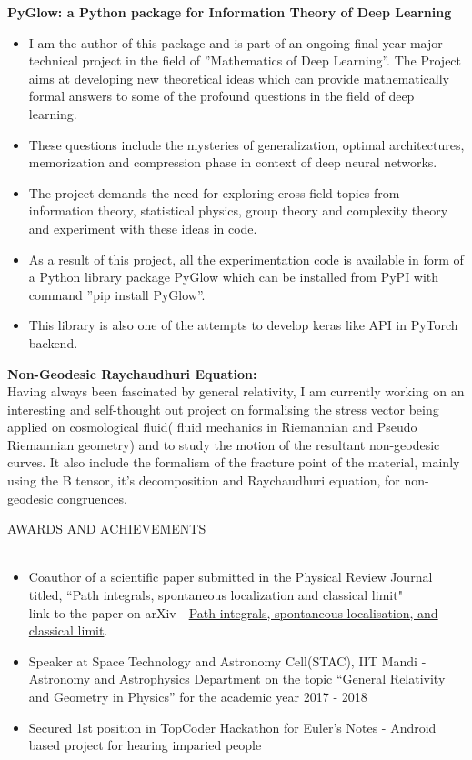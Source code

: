 \documentclass[a4paper]{article}
\newcommand{\lineunder} {
    \vspace*{-8pt} \\
    \hspace*{-18pt} \hrulefill \\
}
\newcommand{\header} [1] {
    {\hspace*{-18pt}\vspace*{6pt} \textsc{#1}}
    \vspace*{-6pt} \lineunder
}
\begin{document}
\vspace*{2mm}
\newpage
\textbf{PyGlow: a Python package for Information Theory of Deep Learning} \\
\begin{itemize}
    \item I am the author of this package and is part of an ongoing final year major technical project in the field of ”Mathematics of Deep Learning”. The Project aims at developing new theoretical ideas which can provide mathematically formal answers to some of the profound questions in the field of deep learning.
    \item These questions include the mysteries of generalization, optimal architectures, memorization and compression phase in context of deep neural networks.
    \item The project demands the need for exploring cross field topics from information theory, statistical physics, group theory and complexity theory and experiment with these ideas in code.
    \item As a result of this project, all the experimentation code is available in form of a Python library package PyGlow which can be installed from PyPI with command ”pip install PyGlow”.
    \item This library is also one of the attempts to develop keras like API in PyTorch backend.
\end{itemize}
\vspace*{2mm}

\textbf{Non-Geodesic Raychaudhuri Equation: }\\
Having always been fascinated by general relativity, I am currently working on an interesting and self-thought out project on formalising the stress vector being applied on cosmological fluid( fluid mechanics in Riemannian and Pseudo Riemannian geometry) and to study the motion of the resultant non-geodesic curves. It also include the formalism of the fracture point of the material, mainly using the B tensor, it’s decomposition and Raychaudhuri equation, for non-geodesic congruences. \\
\vspace{2mm}
\newpage

\header{AWARDS AND ACHIEVEMENTS}
\begin{itemize} \itemsep 1pt
    \item Coauthor of a scientific paper submitted in the Physical Review Journal titled, “Path integrals, spontaneous localization and classical limit"\\
    link to the paper on arXiv - \href{https://bit.ly/2AOwPsf}{Path integrals, spontaneous localisation, and classical limit}.
    \item Speaker at Space Technology and Astronomy Cell(STAC), IIT Mandi - Astronomy and Astrophysics Department on the topic “General Relativity and Geometry in Physics” for the academic year 2017 - 2018 \\
    \item Secured 1st position in TopCoder Hackathon for Euler’s Notes - Android based project for hearing imparied people \\
\end{itemize}
\vspace{2mm}
\end{document}

